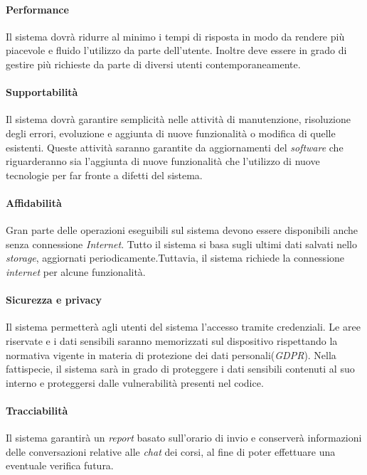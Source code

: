 \paragraph{Performance\\} 
Il sistema dovrà ridurre al minimo i tempi di risposta in modo da rendere più piacevole e fluido l’utilizzo da parte dell’utente. Inoltre deve essere in grado di gestire più richieste da parte di diversi utenti contemporaneamente.

\paragraph{Supportabilità\\} 
Il sistema dovrà garantire semplicità nelle attività di manutenzione, risoluzione degli errori, evoluzione e aggiunta di nuove funzionalità o modifica di quelle esistenti.
Queste attività saranno garantite da aggiornamenti del \emph{software} che riguarderanno sia l’aggiunta di nuove funzionalità che l'utilizzo di nuove tecnologie per far fronte a difetti del sistema.

\paragraph{Affidabilità\\} 
Gran parte delle operazioni eseguibili sul sistema devono essere disponibili anche senza connessione \emph{Internet}. Tutto il sistema si basa sugli ultimi dati salvati nello \textit{storage}, aggiornati periodicamente.Tuttavia, il sistema richiede la connessione \emph{internet} per alcune funzionalità.

\paragraph{Sicurezza e privacy\\} 
Il sistema permetterà agli utenti del sistema l’accesso tramite credenziali. Le aree riservate e i dati sensibili saranno memorizzati sul dispositivo rispettando la normativa vigente in materia di protezione dei dati personali(\textit{GDPR}). Nella fattispecie, il sistema sarà in grado di proteggere i dati sensibili contenuti al suo interno e proteggersi dalle vulnerabilità presenti nel codice.

\paragraph{Tracciabilità\\} 
Il sistema garantirà un \emph{report} basato sull’orario di invio e conserverà informazioni delle conversazioni relative alle \emph{chat} dei corsi, al fine di poter effettuare una eventuale verifica futura.\\

